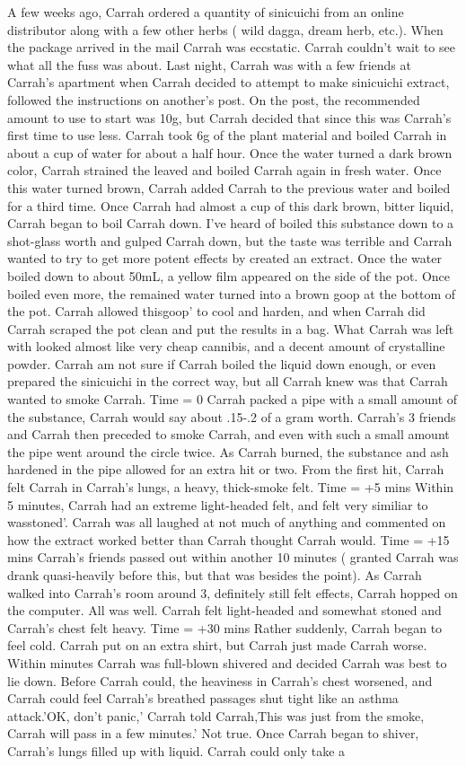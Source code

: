 \documentclass[12pt]{book}
\begin{document}
A few weeks ago, Carrah ordered a quantity of sinicuichi from an online distributor along with a few other herbs ( wild dagga, dream herb, etc.). When the package arrived in the mail Carrah was eccstatic. Carrah couldn't wait to see what all the fuss was about. Last night, Carrah was with a few friends at Carrah's apartment when Carrah decided to attempt to make sinicuichi extract, followed the instructions on another's post. On the post, the recommended amount to use to start was 10g, but Carrah decided that since this was Carrah's first time to use less. Carrah took 6g of the plant material and boiled Carrah in about a cup of water for about a half hour. Once the water turned a dark brown color, Carrah strained the leaved and boiled Carrah again in fresh water. Once this water turned brown, Carrah added Carrah to the previous water and boiled for a third time. Once Carrah had almost a cup of this dark brown, bitter liquid, Carrah began to boil Carrah down. I've heard of boiled this substance down to a shot-glass worth and gulped Carrah down, but the taste was terrible and Carrah wanted to try to get more potent effects by created an extract. Once the water boiled down to about 50mL, a yellow film appeared on the side of the pot. Once boiled even more, the remained water turned into a brown goop at the bottom of the pot. Carrah allowed thisgoop' to cool and harden, and when Carrah did Carrah scraped the pot clean and put the results in a bag. What Carrah was left with looked almost like very cheap cannibis, and a decent amount of crystalline powder. Carrah am not sure if Carrah boiled the liquid down enough, or even prepared the sinicuichi in the correct way, but all Carrah knew was that Carrah wanted to smoke Carrah. Time = 0 Carrah packed a pipe with a small amount of the substance, Carrah would say about .15-.2 of a gram worth. Carrah's 3 friends and Carrah then preceded to smoke Carrah, and even with such a small amount the pipe went around the circle twice. As Carrah burned, the substance and ash hardened in the pipe allowed for an extra hit or two. From the first hit, Carrah felt Carrah in Carrah's lungs, a heavy, thick-smoke felt. Time = +5 mins Within 5 minutes, Carrah had an extreme light-headed felt, and felt very similiar to wasstoned'. Carrah was all laughed at not much of anything and commented on how the extract worked better than Carrah thought Carrah would. Time = +15 mins Carrah's friends passed out within another 10 minutes ( granted Carrah was drank quasi-heavily before this, but that was besides the point). As Carrah walked into Carrah's room around 3, definitely still felt effects, Carrah hopped on the computer. All was well. Carrah felt light-headed and somewhat stoned and Carrah's chest felt heavy. Time = +30 mins Rather suddenly, Carrah began to feel cold. Carrah put on an extra shirt, but Carrah just made Carrah worse. Within minutes Carrah was full-blown shivered and decided Carrah was best to lie down. Before Carrah could, the heaviness in Carrah's chest worsened, and Carrah could feel Carrah's breathed passages shut tight like an asthma attack.'OK, don't panic,' Carrah told Carrah,This was just from the smoke, Carrah will pass in a few minutes.' Not true. Once Carrah began to shiver, Carrah's lungs filled up with liquid. Carrah could only take a 
\end{document}
